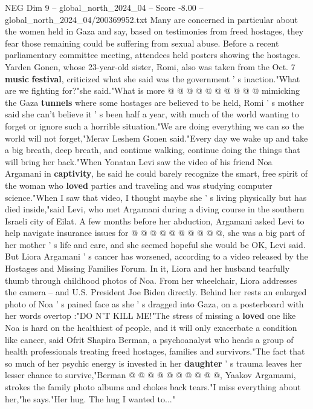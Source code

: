 \begin{textsample}{NEG Dim 9 – global\_north\_2024\_04 – Score -8.00 – global\_north\_2024\_04/200369952.txt}
Many are concerned in particular about the women held in Gaza and say, based on testimonies from freed hostages, they fear those remaining could be suffering from sexual abuse.
Before a recent parliamentary committee meeting, attendees held posters showing the hostages.
Yarden Gonen, whose 23-year-old sister, Romi, also was taken from the Oct. 7 \textbf{music} \textbf{festival}, criticized what she said was the government ' s inaction."What are we fighting for?"she said."What is more @ @ @ @ @ @ @ @ @ @ mimicking the Gaza \textbf{tunnels} where some hostages are believed to be held, Romi ' s mother said she can't believe it ' s been half a year, with much of the world wanting to forget or ignore such a horrible situation."We are doing everything we can so the world will not forget,"Merav Leshem Gonen said."Every day we wake up and take a big breath, deep breath, and continue walking, continue doing the things that will bring her back."When Yonatan Levi saw the video of his friend Noa Argamani in \textbf{captivity}, he said he could barely recognize the smart, free spirit of the woman who \textbf{loved} parties and traveling and was studying computer science."When I saw that video, I thought maybe she ' s living physically but has died inside,"said Levi, who met Argamani during a diving course in the southern Israeli city of Eilat.
A few months before her abduction, Argamani asked Levi to help navigate insurance issues for @ @ @ @ @ @ @ @ @ @, she was a big part of her mother ' s life and care, and she seemed hopeful she would be OK, Levi said.
But Liora Argamani ' s cancer has worsened, according to a video released by the Hostages and Missing Families Forum.
In it, Liora and her husband tearfully thumb through childhood photos of Noa.
From her wheelchair, Liora addresses the camera -- and U.S.
President Joe Biden directly.
Behind her rests an enlarged photo of Noa ' s pained face as she ' s dragged into Gaza, on a posterboard with her words overtop :"DO N'T KILL ME!"The stress of missing a \textbf{loved} one like Noa is hard on the healthiest of people, and it will only exacerbate a condition like cancer, said Ofrit Shapira Berman, a psychoanalyst who heads a group of health professionals treating freed hostages, families and survivors."The fact that so much of her psychic energy is invested in her \textbf{daughter} ' s trauma leaves her lesser chance to survive,"Berman @ @ @ @ @ @ @ @ @ @, Yaakov Argamami, strokes the family photo albums and chokes back tears."I miss everything about her,"he says."Her hug.
The hug I wanted to..."

\end{textsample}

